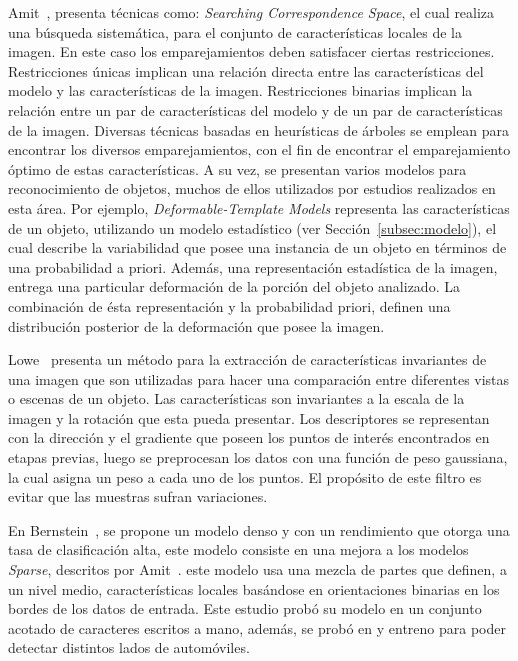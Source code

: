 Amit~\cite{Amit2002}, presenta técnicas como: \textit{Searching Correspondence Space}, el cual realiza una búsqueda sistemática, para el conjunto de características locales de la imagen. En este caso los emparejamientos deben satisfacer ciertas restricciones. Restricciones únicas implican una relación directa entre las características del modelo y las características de la imagen. Restricciones binarias implican la relación entre un par de características del modelo y de un par de características de la imagen. Diversas técnicas basadas en heurísticas de árboles se emplean para encontrar los diversos emparejamientos, con el fin de encontrar el emparejamiento óptimo de estas características. A su vez, se presentan varios modelos para reconocimiento de objetos, muchos de ellos utilizados por estudios realizados en esta área. Por ejemplo, \textit{Deformable-Template Models} representa las características de un objeto, utilizando un modelo estadístico (ver Sección~\ref{subsec:modelo}), el cual describe la variabilidad que posee una instancia de un objeto en términos de una probabilidad a priori. Además, una representación  estadística de la imagen, entrega una particular deformación de la porción del objeto analizado. La combinación de ésta representación y la probabilidad priori, definen una distribución posterior de la deformación que posee la imagen.

Lowe~\cite{sift2004} presenta un método para la extracción de características invariantes de una imagen que son utilizadas para hacer una comparación entre diferentes vistas o escenas de un objeto. Las características son invariantes a la escala de la imagen y la rotación que esta pueda presentar. Los descriptores se representan con la dirección y el gradiente que poseen los puntos de interés encontrados en etapas previas, luego se preprocesan los datos con una función de peso gaussiana, la cual asigna un peso a cada uno de los puntos. El propósito de este filtro es evitar que las muestras sufran variaciones.

En Bernstein~\cite{statistical2005}, se propone un modelo denso y con un rendimiento que otorga una tasa de clasificación alta, este modelo consiste en una mejora a los modelos \textit{Sparse}, descritos por Amit~\cite{Amit2002}. este modelo usa una mezcla de partes que definen, a un nivel medio, características locales basándose en orientaciones binarias en los bordes de los datos de entrada. Este estudio probó su modelo en un conjunto acotado de caracteres escritos a mano, además, se probó en y entreno para poder detectar distintos lados de automóviles.

